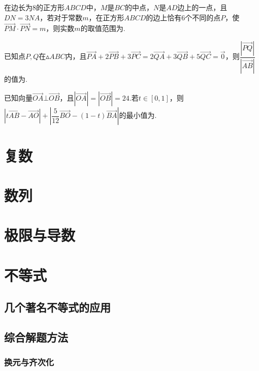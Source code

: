 \documentclass[cn,hazy,black,10pt,normal]{elegantnote}
\newcommand{\tk}{\uline{\hspace{4em}}}
\newcommand{\xl}[1]{\overrightarrow{#1}}
\begin{document}
\begin{problem} %
	在边长为$8$的正方形$ABCD$中，$M$是$BC$的中点，$N$是$AD$边上的一点，且$DN=3NA$，若对于常数$m$，在正方形$ABCD$的边上恰有$6$个不同的点$P$，使$\xl{PM} \cdot \xl{PN} = m$，则实数$m$的取值范围为\tk .
\end{problem}

\begin{problem} %
	已知点$P,Q$在$\vartriangle ABC$内，且$\xl{PA}+2\xl{PB}+3\xl{PC}=2\xl{QA}+3\xl{QB}+5\xl{QC}=\xl{0}$，则$\dfrac{|\xl{PQ}|}{|\xl{AB}|}$的值为\tk .
\end{problem}

\begin{problem} %
	已知向量$\xl{OA} \bot \xl{OB}$，且$|\xl{OA}|=|\xl{OB}|=24$.若$t \in [0,1]$，则$|t\xl{AB}-\xl{AO}| + |\dfrac{5}{12} \xl{BO} - (1-t)\xl{BA}|$的最小值为\tk .
\end{problem}



\chapter{复数}

\chapter{数列}

\chapter{极限与导数}

\chapter{不等式}

\section{几个著名不等式的应用}

\section{综合解题方法}

\subsection{换元与齐次化}
\end{document}
